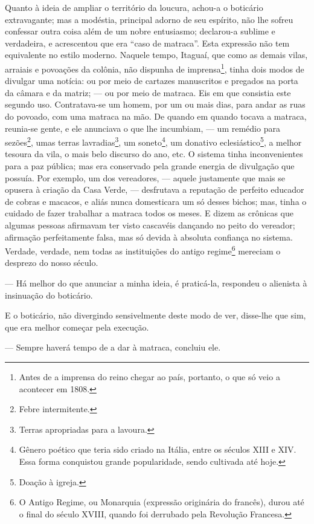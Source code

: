 Quanto à ideia de ampliar o território da loucura, achou-a o boticário
extravagante; mas a modéstia, principal adorno de seu espírito, não lhe
sofreu confessar outra coisa além de um nobre entusiasmo; declarou-a
sublime e verdadeira, e acrescentou que era ``caso de matraca''. Esta
expressão não tem equivalente no estilo moderno. Naquele tempo, Itaguaí,
que como as demais vilas, arraiais e povoações da colônia, não dispunha
de imprensa\footnote{Antes de a imprensa do reino chegar ao país,
  portanto, o que só veio a acontecer em 1808.}, tinha dois modos de
divulgar uma notícia: ou por meio de cartazes manuscritos e pregados na
porta da câmara e da matriz; --- ou por meio de matraca. Eis em que
consistia este segundo uso. Contratava-se um homem, por um ou mais dias,
para andar as ruas do povoado, com uma matraca na mão. De quando em
quando tocava a matraca, reunia-se gente, e ele anunciava o que lhe
incumbiam, --- um remédio para sezões\footnote{Febre intermitente.},
umas terras lavradias\footnote{Terras apropriadas para a lavoura.}, um
soneto\footnote{Gênero poético que teria sido criado na Itália, entre os
  séculos XIII e XIV. Essa forma conquistou grande popularidade, sendo
  cultivada até hoje.}, um donativo eclesiástico\footnote{Doação à
  igreja.}, a melhor tesoura da vila, o mais belo discurso do ano, etc.
O sistema tinha inconvenientes para a paz pública; mas era conservado
pela grande energia de divulgação que possuía. Por exemplo, um dos
vereadores, --- aquele justamente que mais se opusera à criação da Casa
Verde, --- desfrutava a reputação de perfeito educador de cobras e
macacos, e aliás nunca domesticara um só desses bichos; mas, tinha o
cuidado de fazer trabalhar a matraca todos os meses. E dizem as crônicas
que algumas pessoas afirmavam ter visto cascavéis dançando no peito do
vereador; afirmação perfeitamente falsa, mas só devida à absoluta
confiança no sistema. Verdade, verdade, nem todas as instituições do
antigo regime\footnote{O Antigo Regime, ou Monarquia (expressão
  originária do francês), durou até o final do século XVIII, quando foi
  derrubado pela Revolução Francesa.} mereciam o desprezo do nosso
século.

--- Há melhor do que anunciar a minha ideia, é praticá-la, respondeu o
alienista à insinuação do boticário.

E o boticário, não divergindo sensivelmente deste modo de ver, disse-lhe
que sim, que era melhor começar pela execução.

--- Sempre haverá tempo de a dar à matraca, concluiu ele.

